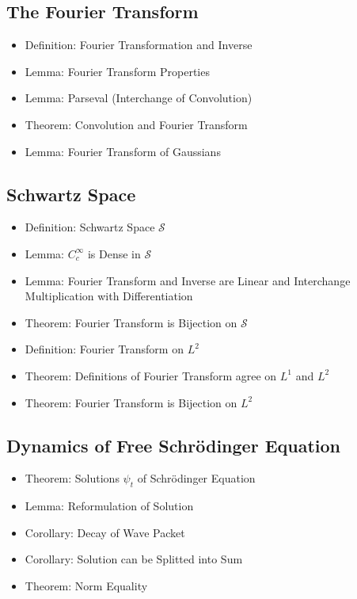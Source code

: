 \documentclass[8pt,twocolumn]{article}
\begin{document}
    \subsection{The Fourier Transform} %
    \label{sub:the_fourier_transform}
      \begin{itemize}
        \item Definition: Fourier Transformation and Inverse
        \item Lemma: Fourier Transform Properties
        \item Lemma: Parseval (Interchange of Convolution)
        \item Theorem: Convolution and Fourier Transform
        \item Lemma: Fourier Transform of Gaussians
      \end{itemize}

    \subsection{Schwartz Space} %
    \label{sub:schwartz_space}
      \begin{itemize}
        \item Definition: Schwartz Space $\mathscr{S}$
        \item Lemma: $C_c^\infty$ is Dense in $\mathscr{S}$
        \item Lemma: Fourier Transform and Inverse are Linear and Interchange Multiplication with Differentiation
        \item Theorem: Fourier Transform is Bijection on $\mathscr{S}$
        \item Definition: Fourier Transform on $L^2$
        \item Theorem: Definitions of Fourier Transform agree on $L^1$ and $L^2$
        \item Theorem: Fourier Transform is Bijection on $L^2$
      \end{itemize}

    \subsection{Dynamics of Free Schrödinger Equation} %
      \begin{itemize}
        \item Theorem: Solutions $\psi_t$ of Schrödinger Equation
        \item Lemma: Reformulation of Solution
        \item Corollary: Decay of Wave Packet
        \item Corollary: Solution can be Splitted into Sum
        \item Theorem: Norm Equality
      \end{itemize}
\end{document}
